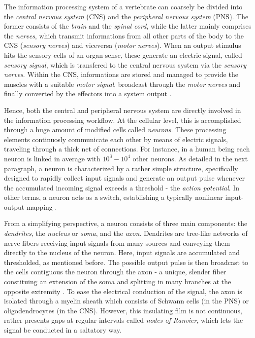 \documentclass[12pt, a4paper, twoside, openright]{report}
\numberwithin{equation}{chapter}
\theoremstyle{theorem}
\theoremstyle{definition}
\theoremstyle{remark}
\theoremstyle{proposition}
\numberwithin{figure}{chapter}
\begin{document}
		The information processing system of a vertebrate can coarsely be divided into the \emph{central nervous system} (CNS) and the \emph{peripheral nervous system} (PNS). The former consists of the \emph{brain} and the \emph{spinal cord}, while the latter mainly comprises the \emph{nerves}, which transmit informations from all other parts of the body to the CNS (\emph{sensory nerves}) and viceversa (\emph{motor nerves}). When an output stimulus hits the sensory cells of an organ sense, these generate an electric signal, called \emph{sensory signal}, which is transfered to the central nervous system via the \emph{sensory nerves}. Within the CNS, informations are stored and managed to provide the muscles with a suitable \emph{motor signal}, broadcast through the \emph{motor nerves} and finally converted by the effectors into a system output \cite{Hay05}. %
		
		Hence, both the central and peripheral nervous system are directly involved in the information processing workflow. At the cellular level, this is accomplished through a huge amount of modified cells called \emph{neurons}. These processing elements continuosly communicate each other by means of electric signals, traveling through a thick net of connections. For instance, in a human being each neuron is linked in average with $10^3 - 10^4$ other neurons. As detailed in the next paragraph, a neuron is characterized by a rather simple structure, specifically designed to rapidly collect input signals and generate an output pulse whenever the accumulated incoming signal exceeds a threshold - the \emph{action potential}. In other terms, a neuron acts as a switch, establishing a typically nonlinear input-output mapping \cite{Kri}.
		
		From a simplifying perspective, a neuron consists of three main components: the \emph{dendrites}, the \emph{nucleus} or \emph{soma}, and the \emph{axon}. Dendrites are tree-like networks of nerve fibers receiving input signals from many sources and conveying them directly to the nucleus of the neuron. Here, input signals are accumulated and thresholded, as mentioned before. The possible output pulse is then broadcast to the cells contiguous the neuron through the axon - a unique, slender fiber constituing an extension of the soma and splitting in many branches at the opposite extremity \cite{SD13}. To ease the electrical conduction of the signal, the axon is isolated through a myelin sheath which consists of Schwann cells (in the PNS) or oligodendrocytes (in the CNS). However, this insulating film is not continuous, rather presents gaps at regular intervals called \emph{nodes of Ranvier}, which lets the signal be conducted in a saltatory way.
		
\end{document}
